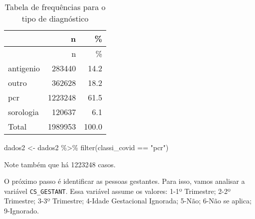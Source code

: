 \documentclass[
]{article}
\newenvironment{Shaded}{\begin{snugshade}}{\end{snugshade}}
\newcommand{\AttributeTok}[1]{\textcolor[rgb]{0.77,0.63,0.00}{#1}}
\newcommand{\CommentTok}[1]{\textcolor[rgb]{0.56,0.35,0.01}{\textit{#1}}}
\newcommand{\ConstantTok}[1]{\textcolor[rgb]{0.00,0.00,0.00}{#1}}
\newcommand{\DecValTok}[1]{\textcolor[rgb]{0.00,0.00,0.81}{#1}}
\newcommand{\FunctionTok}[1]{\textcolor[rgb]{0.00,0.00,0.00}{#1}}
\newcommand{\NormalTok}[1]{#1}
\newcommand{\OtherTok}[1]{\textcolor[rgb]{0.56,0.35,0.01}{#1}}
\newcommand{\SpecialCharTok}[1]{\textcolor[rgb]{0.00,0.00,0.00}{#1}}
\newcommand{\StringTok}[1]{\textcolor[rgb]{0.31,0.60,0.02}{#1}}
\begin{document}
\begin{longtable}[]{@{}lrr@{}}
\caption{Tabela de frequências para o tipo de
diagnóstico}\tabularnewline
\toprule
& n & \% \\
\midrule
\endfirsthead
\toprule
& n & \% \\
\midrule
\endhead
antigenio & 283440 & 14.2 \\
outro & 362628 & 18.2 \\
pcr & 1223248 & 61.5 \\
sorologia & 120637 & 6.1 \\
Total & 1989953 & 100.0 \\
\bottomrule
\end{longtable}

\begin{Shaded}
\begin{Highlighting}[]
\NormalTok{dados2 }\OtherTok{\textless{}{-}}\NormalTok{ dados2 }\SpecialCharTok{\%\textgreater{}\%} 
  \FunctionTok{filter}\NormalTok{(classi\_covid }\SpecialCharTok{==} \StringTok{"pcr"}\NormalTok{)}
\end{Highlighting}
\end{Shaded}

Note também que há 1223248 casos.

O próximo passo é identificar as pessoas gestantes. Para isso, vamos
analisar a variável \texttt{CS\_GESTANT}. Essa variável assume os
valores: 1-1º Trimestre; 2-2º Trimestre; 3-3º Trimestre; 4-Idade
Gestacional Ignorada; 5-Não; 6-Não se aplica; 9-Ignorado.

\begin{Shaded}
\end{Shaded}
\end{document}
